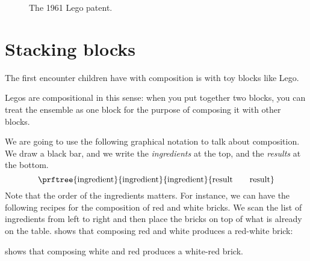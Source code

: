 \begin{figure*}[p]
    \centering
    \caption{The 1961 Lego patent.}
\end{figure*}


\section{Stacking blocks}





The first encounter children have with composition is with toy blocks like Lego.

Legos are compositional in this sense: when you put together two blocks, you can treat the ensemble as one block for the purpose of composing it with other blocks.

We are going to use the following graphical notation to talk about composition.
We draw a black bar, and we write the \emph{ingredients} at the top, and the \emph{results} at the bottom.
%
\begin{equation}
    \prftree{
        \text{ingredient}
    }{
        \text{ingredient}
    }{
        \text{ingredient}
    }{
        \text{result} \quad \quad \text{result}
    }
\end{equation}
%
Note that the order of the ingredients matters.
For instance, we can have the following recipes for the composition of red and white bricks.
We scan the list of ingredients from left to right and then place the bricks on top of what is already on the table.
 shows that composing red and white produces a red-white brick:

%
 shows that composing white and red produces a white-red brick.


